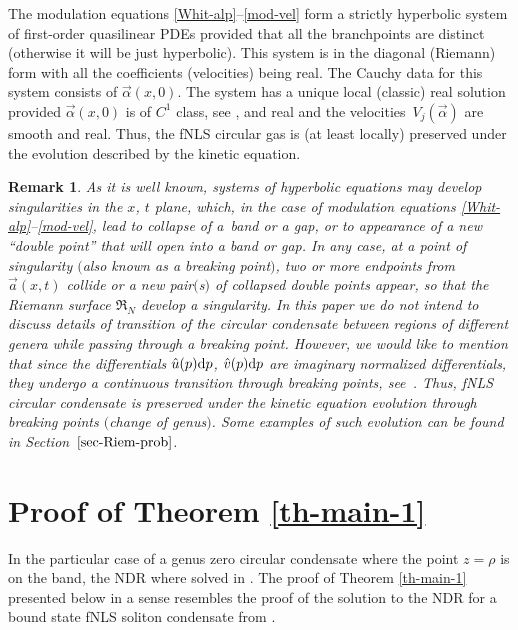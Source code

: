 \documentclass[pdftex]{sigma}
\numberwithin{equation}{section}
\newtheorem{Remark}[Theorem]{Remark}
\def\a{\alpha}
\begin{document}
The modulation equations
\eqref{Whit-alp}--\eqref{mod-vel} form a strictly hyperbolic system of first-order quasilinear PDEs provided that all the branchpoints are distinct (otherwise it will be just hyperbolic). This system is in the diagonal (Riemann) form with all the coefficients (velocities) being real. The Cauchy data for this system consists of $\vec\a(x,0)$. The system has a unique local (classic) real solution provided $\vec\a(x,0)$ is of $C^1$ class, see \cite[Theorem 7.8.1]{DafBook}, and real and the velocities~$V_j(\vec\a)$ are smooth and real. Thus, the fNLS circular gas is (at least locally) preserved under the evolution described by the kinetic equation.

\begin{Remark}\label{rem-break}
As it is well known, systems of hyperbolic equations may develop singularities in the $x$, $t$ plane, which, in the case of modulation equations \eqref{Whit-alp}--\eqref{mod-vel}, lead to collapse of a~band or a gap, or to appearance of a new ``double point'' that will open into a band or gap. In any case, at a point of singularity $($also known as a breaking point$)$, two or more endpoints from~$\vec a(x,t)$ collide or a new pair$($s$)$ of collapsed double points appear, so that the Riemann surface $\mathfrak R_N$ develop a singularity.
In this paper we do not intend to discuss details of transition of the circular condensate between regions of different genera while passing through a breaking point.
However, we would like to mention that
since the differentials $\hat u(p){\rm d}p$, $\hat v(p){\rm d}p$
are imaginary normalized differentials, they undergo a continuous transition through breaking points, see~{\rm \cite{BT14}}. Thus, fNLS circular condensate is preserved under the kinetic equation evolution through breaking points $($change of genus$)$. Some examples of such evolution can be found in Section~$\ref{sec-Riem-prob}$.
\end{Remark}

\section{Proof of Theorem \ref{th-main-1}}\label{s2}
In the particular case of a genus zero circular condensate where the point $z=\rho$ is on the band, the NDR where solved in \cite{ET2020}.
The proof of Theorem \ref{th-main-1} presented below in a sense resembles the proof of the solution to the NDR for a bound state fNLS soliton condensate from
\cite{KT2021}.
\end{document}
